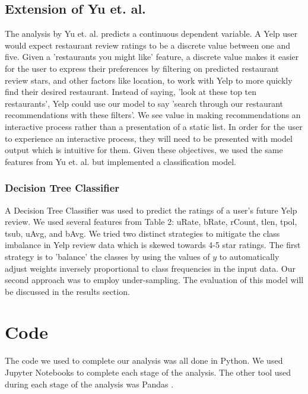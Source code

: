 \documentclass[12pt]{article}
\begin{document}
\subsection{Extension of Yu et. al.}

The analysis by Yu et. al. \cite{yu2015restaurants} predicts a continuous dependent variable.
A Yelp user would expect restaurant review ratings to be a discrete value between
one and five. Given a 'restaurants you might like' feature, a discrete value makes it easier
for the user to express their preferences by filtering on predicted restaurant review stars,
and other factors like location, to work with Yelp to more quickly find their desired restaurant.
Instead of saying, 'look at these top ten restaurants', Yelp could use our model to say
'search through our restaurant recommendations with these filters'. We see value in making
recommendations an interactive process rather than a presentation of a static list. In order
for the user to experience an interactive process, they will need to be presented with
model output which is intuitive for them. Given these objectives, we used the same features
from Yu et. al. \cite{yu2015restaurants} but implemented a classification model.

\subsubsection{Decision Tree Classifier}

A Decision Tree Classifier \cite{sklearnt25:online} was used to predict the ratings
of a user's future Yelp review. We used several features from Table 2: uRate, bRate, rCount,
tlen, tpol, tsub, uAvg, and bAvg. We tried two distinct strategies to mitigate the class imbalance
in Yelp review data which is skewed towards 4-5 star ratings. The first strategy is to
'balance' the classes by using the values of $y$ to automatically adjust weights inversely
proportional to class frequencies in the input data. Our second approach was to employ
under-sampling. The evaluation of this model will be discussed in the results section.

\section{Code}

The code we used to complete our analysis was all done in Python. We used Jupyter Notebooks
\cite{ProjectJ85:online} to complete each stage of the analysis. The other tool used during
each stage of the analysis was Pandas \cite{PythonDa47:online}.
\end{document}
